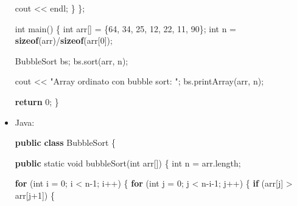 \documentclass[
  letterpaper,
]{scrbook}
\newenvironment{Shaded}{\begin{snugshade}}{\end{snugshade}}
\newcommand{\ControlFlowTok}[1]{\textcolor[rgb]{0.00,0.23,0.31}{\textbf{#1}}}
\newcommand{\DataTypeTok}[1]{\textcolor[rgb]{0.68,0.00,0.00}{#1}}
\newcommand{\DecValTok}[1]{\textcolor[rgb]{0.68,0.00,0.00}{#1}}
\newcommand{\FunctionTok}[1]{\textcolor[rgb]{0.28,0.35,0.67}{#1}}
\newcommand{\KeywordTok}[1]{\textcolor[rgb]{0.00,0.23,0.31}{\textbf{#1}}}
\newcommand{\NormalTok}[1]{\textcolor[rgb]{0.00,0.23,0.31}{#1}}
\newcommand{\OperatorTok}[1]{\textcolor[rgb]{0.37,0.37,0.37}{#1}}
\newcommand{\StringTok}[1]{\textcolor[rgb]{0.13,0.47,0.30}{#1}}
\begin{document}
\begin{itemize}
\begin{Shaded}
\begin{Highlighting}[]
\NormalTok{    cout }\OperatorTok{\textless{}\textless{}}\NormalTok{ endl}\OperatorTok{;}
  \OperatorTok{\}}
\OperatorTok{\};}

\DataTypeTok{int}\NormalTok{ main}\OperatorTok{()} \OperatorTok{\{}
  \DataTypeTok{int}\NormalTok{ arr}\OperatorTok{[]} \OperatorTok{=} \OperatorTok{\{}\DecValTok{64}\OperatorTok{,} \DecValTok{34}\OperatorTok{,} \DecValTok{25}\OperatorTok{,} \DecValTok{12}\OperatorTok{,} \DecValTok{22}\OperatorTok{,} \DecValTok{11}\OperatorTok{,} \DecValTok{90}\OperatorTok{\};}
  \DataTypeTok{int}\NormalTok{ n }\OperatorTok{=} \KeywordTok{sizeof}\OperatorTok{(}\NormalTok{arr}\OperatorTok{)/}\KeywordTok{sizeof}\OperatorTok{(}\NormalTok{arr}\OperatorTok{[}\DecValTok{0}\OperatorTok{]);}

\NormalTok{  BubbleSort bs}\OperatorTok{;}
\NormalTok{  bs}\OperatorTok{.}\NormalTok{sort}\OperatorTok{(}\NormalTok{arr}\OperatorTok{,}\NormalTok{ n}\OperatorTok{);}

\NormalTok{  cout }\OperatorTok{\textless{}\textless{}} \StringTok{"Array ordinato con bubble sort: "}\OperatorTok{;}
\NormalTok{  bs}\OperatorTok{.}\NormalTok{printArray}\OperatorTok{(}\NormalTok{arr}\OperatorTok{,}\NormalTok{ n}\OperatorTok{);}

  \ControlFlowTok{return} \DecValTok{0}\OperatorTok{;}
\OperatorTok{\}}
\end{Highlighting}
\end{Shaded}
\item
  Java:

\begin{Shaded}
\begin{Highlighting}[]
\KeywordTok{public} \KeywordTok{class}\NormalTok{ BubbleSort }\OperatorTok{\{}

  \KeywordTok{public} \DataTypeTok{static} \DataTypeTok{void} \FunctionTok{bubbleSort}\OperatorTok{(}\DataTypeTok{int}\NormalTok{ arr}\OperatorTok{[])} \OperatorTok{\{}
    \DataTypeTok{int}\NormalTok{ n }\OperatorTok{=}\NormalTok{ arr}\OperatorTok{.}\FunctionTok{length}\OperatorTok{;}

    \ControlFlowTok{for} \OperatorTok{(}\DataTypeTok{int}\NormalTok{ i }\OperatorTok{=} \DecValTok{0}\OperatorTok{;}\NormalTok{ i }\OperatorTok{\textless{}}\NormalTok{ n}\OperatorTok{{-}}\DecValTok{1}\OperatorTok{;}\NormalTok{ i}\OperatorTok{++)} \OperatorTok{\{}
      \ControlFlowTok{for} \OperatorTok{(}\DataTypeTok{int}\NormalTok{ j }\OperatorTok{=} \DecValTok{0}\OperatorTok{;}\NormalTok{ j }\OperatorTok{\textless{}}\NormalTok{ n}\OperatorTok{{-}}\NormalTok{i}\OperatorTok{{-}}\DecValTok{1}\OperatorTok{;}\NormalTok{ j}\OperatorTok{++)} \OperatorTok{\{}
        \ControlFlowTok{if} \OperatorTok{(}\NormalTok{arr}\OperatorTok{[}\NormalTok{j}\OperatorTok{]} \OperatorTok{\textgreater{}}\NormalTok{ arr}\OperatorTok{[}\NormalTok{j}\OperatorTok{+}\DecValTok{1}\OperatorTok{])} \OperatorTok{\{}


\end{Highlighting}
\end{Shaded}
\end{itemize}
\end{document}
